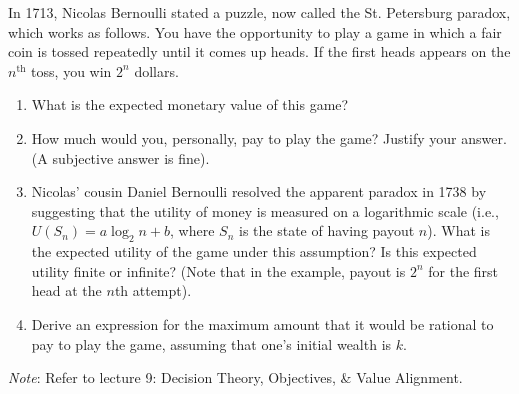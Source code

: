In 1713, Nicolas Bernoulli stated a puzzle, now called the St. Petersburg paradox, which works as follows. You have the opportunity to play a game in which a fair coin is tossed repeatedly until it comes up heads. If the first heads appears on the $n^\text{th}$ toss, you win $2^n$ dollars.

\begin{enumerate}
	\item What is the expected monetary value of this game?
	\item How much would you, personally, pay to play the game? Justify your answer. (A subjective answer is fine).
	\item Nicolas' cousin Daniel Bernoulli resolved the apparent paradox in 1738 by suggesting that the utility of money is measured on a logarithmic scale (i.e., $U(S_n)=a\log_2 n + b$, where $S_n$ is the state of having payout $n$). What is the expected utility of the game under this assumption? Is this expected utility finite or infinite? (Note that in the example, payout is $2^n$ for the first head at the $n$th attempt).
	\item Derive an expression for the maximum amount that it would be rational to pay to play the game, assuming that one's initial wealth is $k$.
\end{enumerate}

\textit{Note}: Refer to lecture 9: Decision Theory, Objectives, \& Value Alignment.

